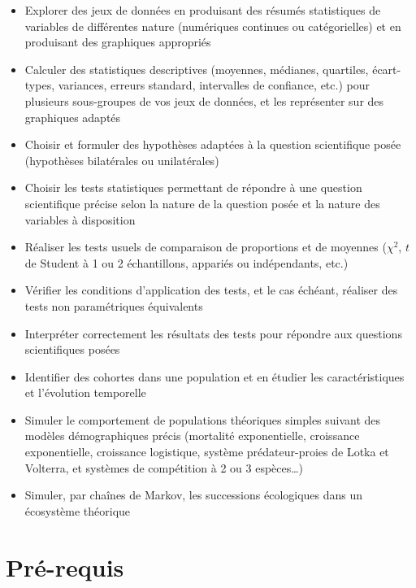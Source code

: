 \documentclass[
  a4paper,
  DIV=11,
  numbers=noendperiod,
  oneside]{scrreprt}
\providecommand{\tightlist}{%
  \setlength{\itemsep}{0pt}\setlength{\parskip}{0pt}}\usepackage{longtable,booktabs,array}
\begin{document}
\begin{itemize}
\tightlist
\item
  Explorer des jeux de données en produisant des résumés statistiques de
  variables de différentes nature (numériques continues ou
  catégorielles) et en produisant des graphiques appropriés
\item
  Calculer des statistiques descriptives (moyennes, médianes, quartiles,
  écart-types, variances, erreurs standard, intervalles de confiance,
  etc.) pour plusieurs sous-groupes de vos jeux de données, et les
  représenter sur des graphiques adaptés
\item
  Choisir et formuler des hypothèses adaptées à la question scientifique
  posée (hypothèses bilatérales ou unilatérales)
\item
  Choisir les tests statistiques permettant de répondre à une question
  scientifique précise selon la nature de la question posée et la nature
  des variables à disposition
\item
  Réaliser les tests usuels de comparaison de proportions et de moyennes
  (\(\chi^2\), \(t\) de Student à 1 ou 2 échantillons, appariés ou
  indépendants, etc.)
\item
  Vérifier les conditions d'application des tests, et le cas échéant,
  réaliser des tests non paramétriques équivalents
\item
  Interpréter correctement les résultats des tests pour répondre aux
  questions scientifiques posées
\item
  Identifier des cohortes dans une population et en étudier les
  caractéristiques et l'évolution temporelle
\item
  Simuler le comportement de populations théoriques simples suivant des
  modèles démographiques précis (mortalité exponentielle, croissance
  exponentielle, croissance logistique, système prédateur-proies de
  Lotka et Volterra, et systèmes de compétition à 2 ou 3 espèces\ldots)
\item
  Simuler, par chaînes de Markov, les successions écologiques dans un
  écosystème théorique
\end{itemize}

\hypertarget{pruxe9-requis}{%
\section*{Pré-requis}\label{pruxe9-requis}}

\end{document}
